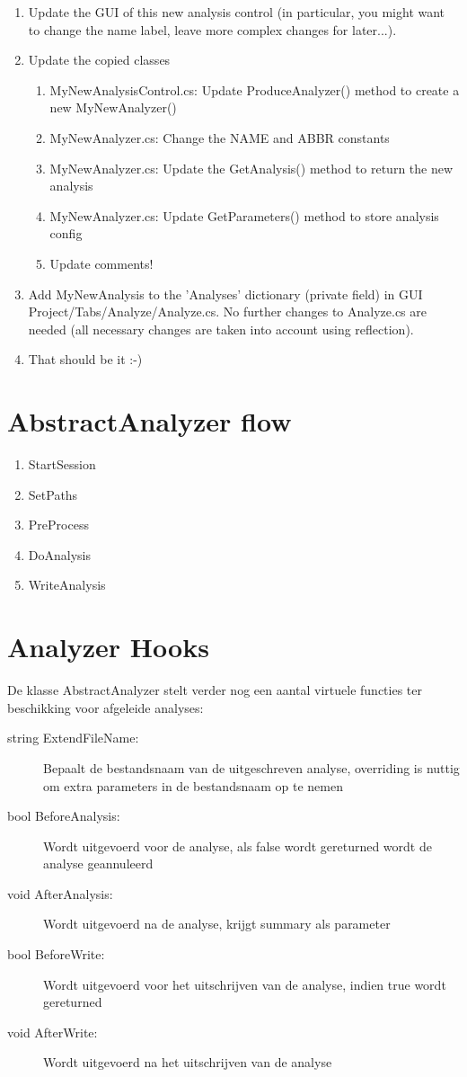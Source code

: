 \documentclass[a4paper,11pt]{report}
\begin{document}
\begin{enumerate}
\item Update the GUI of this new analysis control (in particular, you might want to change the name label, leave more complex changes for later...).
\item Update the copied classes
\begin{enumerate}
\item MyNewAnalysisControl.cs: Update ProduceAnalyzer() method to create a new MyNewAnalyzer()
\item MyNewAnalyzer.cs: Change the NAME and ABBR constants
\item MyNewAnalyzer.cs: Update the GetAnalysis() method to return the new analysis
\item MyNewAnalyzer.cs: Update GetParameters() method to store analysis config
\item Update comments!
\end{enumerate}
\item Add MyNewAnalysis to the 'Analyses' dictionary (private field) in GUI Project/Tabs/Analyze/Analyze.cs. No further changes to Analyze.cs are needed (all necessary changes are taken into account using reflection).
\item That should be it :-)
\end{enumerate}

\section{AbstractAnalyzer flow}
\begin{enumerate}
\item StartSession
\item SetPaths
\item PreProcess
\item DoAnalysis
\item WriteAnalysis
\end{enumerate}

\section{Analyzer Hooks}
De klasse AbstractAnalyzer stelt verder nog een aantal virtuele functies ter beschikking voor afgeleide analyses:
\begin{description}
\item[string ExtendFileName:] Bepaalt de bestandsnaam van de uitgeschreven analyse, overriding is nuttig om extra parameters in de bestandsnaam op te nemen
\item[bool BeforeAnalysis:] Wordt uitgevoerd voor de analyse, als false wordt gereturned wordt de analyse geannuleerd
\item[void AfterAnalysis:] Wordt uitgevoerd na de analyse, krijgt summary als parameter
\item[bool BeforeWrite:] Wordt uitgevoerd voor het uitschrijven van de analyse, indien true wordt gereturned
\item[void AfterWrite:] Wordt uitgevoerd na het uitschrijven van de analyse
\end{description}
\end{document}
